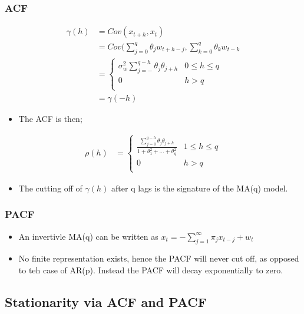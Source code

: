 \documentclass{article}
\begin{document}
\subsubsection{ACF}

\begin{align*}
     \gamma(h) &= Cov(x_{t+h}, x_t)\\
     &= Cov(\sum_{j=0}^q \theta_j w_{t+h-j} , \sum_{k=0}^q \theta_k w_{t-k}\\
     &= \begin{cases}
         \sigma^2_w \sum_{j=-}^{q-h} \theta_j \theta_{j+h} & 0\leq h \leq q\\
         0  & h>q\\
     \end{cases}\\
     &= \gamma(-h)
\end{align*}

\begin{itemize}
   \item The ACF is then;
\end{itemize}

\begin{align*}
    \rho(h) &= \begin{cases}
        \frac{\sum_{j=0}^{q-h} \theta_j \theta_{j+h}}{1 + \theta^2_1 + ... + \theta^2_q} & 1\leq h \leq q\\
    0 & h > q\\
    \end{cases}
\end{align*}

\begin{itemize}
    \item The cutting off of $\gamma(h)$ after q lags is the signature of the MA(q) model.
\end{itemize}


\subsubsection{PACF}
\begin{itemize}
    \item An invertivle MA(q) can be written as $x_t = - \sum_{j=1}^\infty \pi_j x_{t-j} + w_t$
    \item No finite representation exists, hence the PACF will never cut off, as opposed to teh case of AR(p). Instead the PACF will decay exponentially to zero.
\end{itemize}

\subsection{Stationarity via ACF and PACF}
\end{document}
